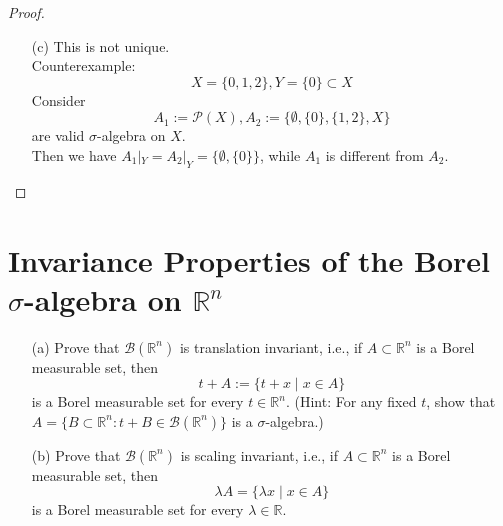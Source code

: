 \documentclass[lang=cn,11pt]{elegantbook}
\begin{document}
\begin{proof}
\begin{itemize}
\begin{enumerate}
    \end{enumerate}

    
    \item[(c)] 
    This is not unique. \\
    \noindent Counterexample:
    \[
    X = \{ 0,1,2\}, Y = \{0\} \subset X
    \]
    Consider
    \[
    A_1 := \mathcal{P}(X), A_2 := \{\emptyset, \{0\}, \{1,2\}, X \}
    \] are valid $\sigma$-algebra on $X$.\\
    \noindent Then we have $A_1 |_Y = A_2 |_Y = \{\emptyset,\{0\}   \}$, while $A_1$ is different from $A_2$.


    
    
\end{itemize}
\end{proof}


\section{Invariance Properties of the Borel $\sigma$-algebra on $\mathbb{R}^n$}
\begin{itemize}
    \item[(a)] Prove that $\mathcal{B}(\mathbb{R}^n)$ is translation invariant, i.e., if $A \subset \mathbb{R}^n$ is a Borel measurable set, then
    \[
    t + A := \{t + x \mid x \in A\}
    \]
    is a Borel measurable set for every $t \in \mathbb{R}^n$. (Hint: For any fixed $t$, show that $A = \{B \subset \mathbb{R}^n : t + B \in \mathcal{B}(\mathbb{R}^n)\}$ is a $\sigma$-algebra.)
    \item[(b)] Prove that $\mathcal{B}(\mathbb{R}^n)$ is scaling invariant, i.e., if $A \subset \mathbb{R}^n$ is a Borel measurable set, then
    \[
    \lambda A = \{\lambda x \mid x \in A\}
    \]
    is a Borel measurable set for every $\lambda \in \mathbb{R}$.
\end{itemize}
\end{document}
